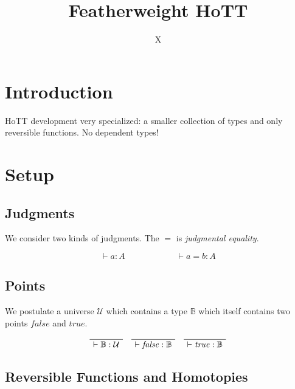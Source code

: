 \documentclass[format=acmlarge,review,natbib]{acmart}
\newcommand{\fc}{\mathit{false}}
\newcommand{\tc}{\mathit{true}}
\newcommand{\boolt}{\mathbb{B}}
\newcommand{\univ}{\mathcal{U}}
\newcommand{\proves}{\vdash}
\newcommand{\jdg}[2]{\proves #1 : #2}
\newcommand{\jdge}[3]{\proves #1 = #2 : #3}
\begin{document}
\title{Featherweight HoTT}

\author{X}

\begin{abstract}
\end{abstract}

\maketitle

\section{Introduction}

HoTT development very specialized: a smaller collection of types and only
reversible functions. No dependent types!

\section{Setup}

\subsection{Judgments}

We consider two kinds of judgments. The $=$ is \emph{judgmental equality}.

\[
\jdg{a}{A} \qquad\qquad\qquad \jdge{a}{b}{A}
\]

\subsection{Points}

We postulate a universe $\univ$ which contains a type $\boolt$ which itself contains
two points $\fc$ and $\tc$.

\[\begin{array}{c}
  \AxiomC{}
  \UnaryInfC{$\jdg{\boolt}{\univ}$}
  \DisplayProof
\quad
  \AxiomC{}
  \UnaryInfC{$\jdg{\fc}{\boolt}$}
  \DisplayProof
\quad
  \AxiomC{}
  \UnaryInfC{$\jdg{\tc}{\boolt}$}
  \DisplayProof
\end{array}\]

\subsection{Reversible Functions and Homotopies}
\end{document}
